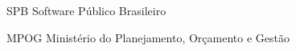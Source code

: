 \begin{siglas}
  \item[SPB] Software Público Brasileiro
  \item[MPOG] Ministério do Planejamento, Orçamento e Gestão
\end{siglas}
